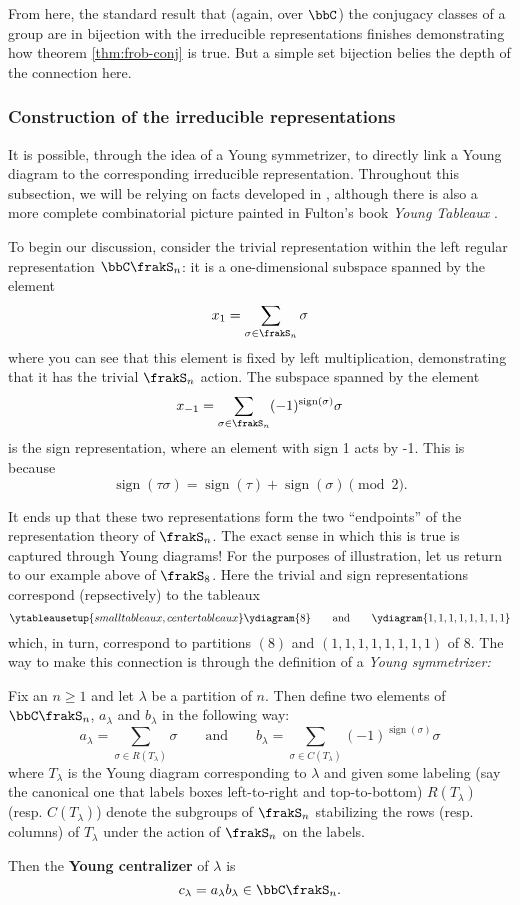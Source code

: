 \documentclass[12pt]{article}
\begin{document}
From here, the standard result that (again, over $\bbC$) the conjugacy classes of a group are in bijection with the irreducible representations finishes demonstrating how 
theorem \ref{thm:frob-conj} is true. But a simple set bijection belies the depth of the connection here. 

\subsubsection{Construction of the irreducible representations}
It is possible, through the idea of a Young symmetrizer, to directly link a Young diagram to the corresponding 
irreducible representation. Throughout this subsection, we will be relying on facts developed in \cite{fulton-harris}, 
although there is also a more complete combinatorial picture painted in Fulton's book \textit{Young Tableaux} \cite{fulton-tableaux}. 

To begin our discussion, consider the trivial representation within the left regular representation $\bbC\frakS_n$: 
it is a one-dimensional subspace spanned by the element 
\[x_1=\sum_{\sigma\in\frakS_n}\sigma\]
where you can see that this element is fixed by left multiplication, demonstrating that it has the trivial $\frakS_n$ action.
The subspace spanned by the element 
\[x_{-1}=\sum_{\sigma\in\frakS_n}(-1)^{\operatorname{sign}(\sigma)}\sigma\]
is the sign representation, where an element with sign 1 acts by -1. This is because
\[\operatorname{sign}(\tau\sigma)=\operatorname{sign}(\tau)+\operatorname{sign}(\sigma)\pmod{2}.\]

It ends up that these two representations form the two ``endpoints'' of the representation theory of $\frakS_n$. The exact sense in which this is 
true is captured through Young diagrams! For the purposes of illustration, let us return to our example above of $\frakS_8$. Here the trivial and sign representations 
correspond (repsectively) to the tableaux
\[\ytableausetup{smalltableaux,centertableaux}\ydiagram{8}\qquad\text{and}\qquad\ydiagram{1,1,1,1,1,1,1,1}\]
which, in turn, correspond to partitions $(8)$ and $(1,1,1,1,1,1,1,1)$ of $8$. The way to make this connection is through the definition 
of a \textit{Young symmetrizer:}
\begin{defn}
	Fix an $n\ge 1$ and let $\lambda$ be a partition of $n$. Then define two elements of $\bbC\frakS_n$, $a_\lambda$ and $b_\lambda$ in the following way:
	\[a_\lambda=\sum_{\sigma\in R(T_\lambda)}\sigma\qquad\text{and}\qquad b_\lambda=\sum_{\sigma\in C(T_\lambda)}(-1)^{\operatorname{sign}(\sigma)}\sigma\]
	where $T_\lambda$ is the Young diagram corresponding to $\lambda$ and given some labeling (say the canonical one that labels boxes left-to-right and top-to-bottom)
	$R(T_\lambda)$ (resp. $C(T_\lambda)$) denote the subgroups of $\frakS_n$ stabilizing the rows (resp. columns) of $T_\lambda$ under the action of $\frakS_n$ on the labels.

	Then the \textbf{Young centralizer} of $\lambda$ is 
	\[c_\lambda=a_\lambda b_\lambda\in\bbC\frakS_n.\]
\end{defn}
\end{document}
